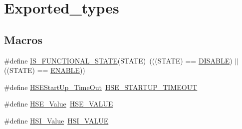\hypertarget{group___exported__types}{}\section{Exported\+\_\+types}
\label{group___exported__types}
\subsection*{Macros}
\begin{DoxyCompactItemize}
\item 
\#define \mbox{\hyperlink{group___exported__types_gaffaf7c3f537d7a3370b1bbdda67a2bf6}{I\+S\+\_\+\+F\+U\+N\+C\+T\+I\+O\+N\+A\+L\+\_\+\+S\+T\+A\+TE}}(S\+T\+A\+TE)~(((S\+T\+A\+TE) == \mbox{\hyperlink{group___exported__types_ggac9a7e9a35d2513ec15c3b537aaa4fba1ad3a9df141be0ccf10389b640f492b26d}{D\+I\+S\+A\+B\+LE}}) $\vert$$\vert$ ((S\+T\+A\+TE) == \mbox{\hyperlink{group___exported__types_ggac9a7e9a35d2513ec15c3b537aaa4fba1a7d46875fa3ebd2c34d2756950eda83bf}{E\+N\+A\+B\+LE}}))
\item 
\#define \mbox{\hyperlink{group___exported__types_ga7e69dacd5c3b950b5b1786d7336b30d3}{H\+S\+E\+Start\+Up\+\_\+\+Time\+Out}}~\mbox{\hyperlink{group___library__configuration__section_ga68ecbc9b0a1a40a1ec9d18d5e9747c4f}{H\+S\+E\+\_\+\+S\+T\+A\+R\+T\+U\+P\+\_\+\+T\+I\+M\+E\+O\+UT}}
\item 
\#define \mbox{\hyperlink{group___exported__types_gab12a1abe6dd0001e7a0487a8b175b28c}{H\+S\+E\+\_\+\+Value}}~\mbox{\hyperlink{group___library__configuration__section_gaeafcff4f57440c60e64812dddd13e7cb}{H\+S\+E\+\_\+\+V\+A\+L\+UE}}
\item 
\#define \mbox{\hyperlink{group___exported__types_ga5718ca1fe0825cdbebb466886cfb5016}{H\+S\+I\+\_\+\+Value}}~\mbox{\hyperlink{group___library__configuration__section_gaaa8c76e274d0f6dd2cefb5d0b17fbc37}{H\+S\+I\+\_\+\+V\+A\+L\+UE}}
\end{DoxyCompactItemize}
